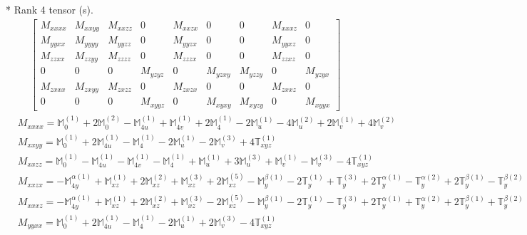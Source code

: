 \documentclass[fleqn,8pt,landscape]{jsarticle}
\begin{document}
* Rank 4 tensor (s).
\begin{align*}
\begin{bmatrix} M_{xxxx} & M_{xxyy} & M_{xxzz} & 0 & M_{xxzx} & 0 & 0 & M_{xxxz} & 0 \\ M_{yyxx} & M_{yyyy} & M_{yyzz} & 0 & M_{yyzx} & 0 & 0 & M_{yyxz} & 0 \\ M_{zzxx} & M_{zzyy} & M_{zzzz} & 0 & M_{zzzx} & 0 & 0 & M_{zzxz} & 0 \\ 0 & 0 & 0 & M_{yzyz} & 0 & M_{yzxy} & M_{yzzy} & 0 & M_{yzyx} \\ M_{zxxx} & M_{zxyy} & M_{zxzz} & 0 & M_{zxzx} & 0 & 0 & M_{zxxz} & 0 \\ 0 & 0 & 0 & M_{xyyz} & 0 & M_{xyxy} & M_{xyzy} & 0 & M_{xyyx} \end{bmatrix}
\end{align*}
\begin{align*}
& M_{xxxx} = \mathbb{M}_{0}^{(1)} + 2 \mathbb{M}_{0}^{(2)} - \mathbb{M}_{4u}^{(1)} + \mathbb{M}_{4v}^{(1)} + 2 \mathbb{M}_{4}^{(1)} - 2 \mathbb{M}_{u}^{(1)} - 4 \mathbb{M}_{u}^{(2)} + 2 \mathbb{M}_{v}^{(1)} + 4 \mathbb{M}_{v}^{(2)} \\
& M_{xxyy} = \mathbb{M}_{0}^{(1)} + 2 \mathbb{M}_{4u}^{(1)} - \mathbb{M}_{4}^{(1)} - 2 \mathbb{M}_{u}^{(1)} - 2 \mathbb{M}_{v}^{(3)} + 4 \mathbb{T}_{xyz}^{(1)} \\
& M_{xxzz} = \mathbb{M}_{0}^{(1)} - \mathbb{M}_{4u}^{(1)} - \mathbb{M}_{4v}^{(1)} - \mathbb{M}_{4}^{(1)} + \mathbb{M}_{u}^{(1)} + 3 \mathbb{M}_{u}^{(3)} + \mathbb{M}_{v}^{(1)} - \mathbb{M}_{v}^{(3)} - 4 \mathbb{T}_{xyz}^{(1)} \\
& M_{xxzx} = - \mathbb{M}_{4y}^{\alpha(1)} + \mathbb{M}_{xz}^{(1)} + 2 \mathbb{M}_{xz}^{(2)} + \mathbb{M}_{xz}^{(3)} + 2 \mathbb{M}_{xz}^{(5)} - \mathbb{M}_{y}^{\beta(1)} - 2 \mathbb{T}_{y}^{(1)} + \mathbb{T}_{y}^{(3)} + 2 \mathbb{T}_{y}^{\alpha(1)} - \mathbb{T}_{y}^{\alpha(2)} + 2 \mathbb{T}_{y}^{\beta(1)} - \mathbb{T}_{y}^{\beta(2)} \\
& M_{xxxz} = - \mathbb{M}_{4y}^{\alpha(1)} + \mathbb{M}_{xz}^{(1)} + 2 \mathbb{M}_{xz}^{(2)} + \mathbb{M}_{xz}^{(3)} - 2 \mathbb{M}_{xz}^{(5)} - \mathbb{M}_{y}^{\beta(1)} - 2 \mathbb{T}_{y}^{(1)} - \mathbb{T}_{y}^{(3)} + 2 \mathbb{T}_{y}^{\alpha(1)} + \mathbb{T}_{y}^{\alpha(2)} + 2 \mathbb{T}_{y}^{\beta(1)} + \mathbb{T}_{y}^{\beta(2)} \\
& M_{yyxx} = \mathbb{M}_{0}^{(1)} + 2 \mathbb{M}_{4u}^{(1)} - \mathbb{M}_{4}^{(1)} - 2 \mathbb{M}_{u}^{(1)} + 2 \mathbb{M}_{v}^{(3)} - 4 \mathbb{T}_{xyz}^{(1)} \\

\end{align*}
\end{document}
